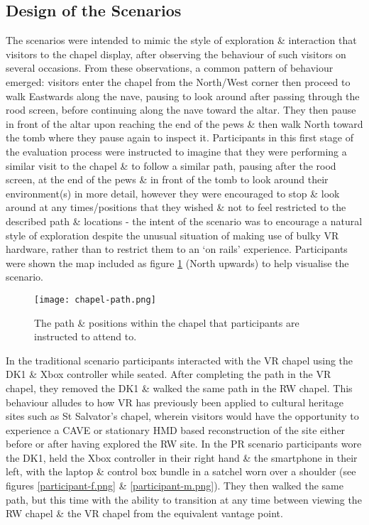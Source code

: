 
\subsection{Design of the Scenarios}

The scenarios were intended to mimic the style of exploration \& interaction that visitors to the chapel display, after observing the behaviour of such visitors on several occasions. From these observations, a common pattern of behaviour emerged: visitors enter the chapel from the North/West corner then proceed to walk Eastwards along the nave, pausing to look around after passing through the rood screen, before continuing along the nave toward the altar. They then pause in front of the altar upon reaching the end of the pews \& then walk North toward the tomb where they pause again to inspect it. Participants in this first stage of the evaluation process were instructed to imagine that they were performing a similar visit to the chapel \& to follow a similar path, pausing after the rood screen, at the end of the pews \& in front of the tomb to look around their environment(s) in more detail, however they were encouraged to stop \& look around at any times/positions that they wished \& not to feel restricted to the described path \& locations - the intent of the scenario was to encourage a natural style of exploration despite the unusual situation of making use of bulky VR hardware, rather than to restrict them to an `on rails' experience. Participants were shown the map included as figure \ref{chapel-path} (North upwards) to help visualise the scenario.

\begin{figure}[h]
	\begin{center}
		\texttt{[image: chapel-path.png]}
		\caption{The path \& positions within the chapel that participants are instructed to attend to.}
		\label{chapel-path}
	\end{center}
\end{figure}

In the traditional scenario participants interacted with the VR chapel using the DK1 \& Xbox controller while seated. After completing the path in the VR chapel, they removed the DK1 \& walked the same path in the RW chapel. This behaviour alludes to how VR has previously been applied to cultural heritage sites such as St Salvator's chapel, wherein visitors would have the opportunity to experience a CAVE or stationary HMD based reconstruction of the site either before or after having explored the RW site. In the PR scenario participants wore the DK1, held the Xbox controller in their right hand \& the smartphone in their left, with the laptop \& control box bundle in a satchel worn over a shoulder (see figures \ref{participant-f.png} \& \ref{participant-m.png}). They then walked the same path, but this time with the ability to transition at any time between viewing the RW chapel \& the VR chapel from the equivalent vantage point.


